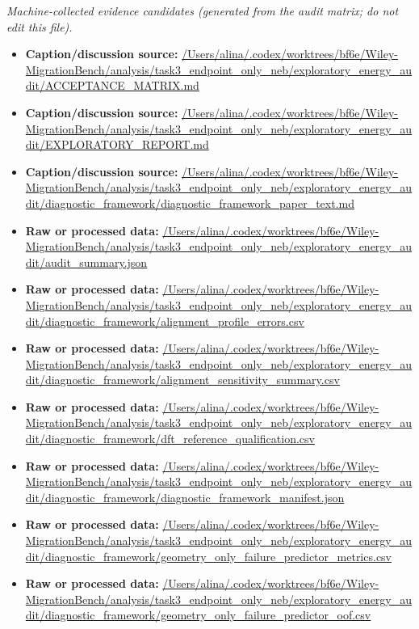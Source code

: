 \emph{Machine-collected evidence candidates (generated from the audit matrix; do not edit this file).}
\begin{itemize}[leftmargin=1.4em,noitemsep]
\item \textbf{Caption/discussion source:} \url{/Users/alina/.codex/worktrees/bf6e/Wiley-MigrationBench/analysis/task3_endpoint_only_neb/exploratory_energy_audit/ACCEPTANCE_MATRIX.md}
\item \textbf{Caption/discussion source:} \url{/Users/alina/.codex/worktrees/bf6e/Wiley-MigrationBench/analysis/task3_endpoint_only_neb/exploratory_energy_audit/EXPLORATORY_REPORT.md}
\item \textbf{Caption/discussion source:} \url{/Users/alina/.codex/worktrees/bf6e/Wiley-MigrationBench/analysis/task3_endpoint_only_neb/exploratory_energy_audit/diagnostic_framework/diagnostic_framework_paper_text.md}
\item \textbf{Raw or processed data:} \url{/Users/alina/.codex/worktrees/bf6e/Wiley-MigrationBench/analysis/task3_endpoint_only_neb/exploratory_energy_audit/audit_summary.json}
\item \textbf{Raw or processed data:} \url{/Users/alina/.codex/worktrees/bf6e/Wiley-MigrationBench/analysis/task3_endpoint_only_neb/exploratory_energy_audit/diagnostic_framework/alignment_profile_errors.csv}
\item \textbf{Raw or processed data:} \url{/Users/alina/.codex/worktrees/bf6e/Wiley-MigrationBench/analysis/task3_endpoint_only_neb/exploratory_energy_audit/diagnostic_framework/alignment_sensitivity_summary.csv}
\item \textbf{Raw or processed data:} \url{/Users/alina/.codex/worktrees/bf6e/Wiley-MigrationBench/analysis/task3_endpoint_only_neb/exploratory_energy_audit/diagnostic_framework/dft_reference_qualification.csv}
\item \textbf{Raw or processed data:} \url{/Users/alina/.codex/worktrees/bf6e/Wiley-MigrationBench/analysis/task3_endpoint_only_neb/exploratory_energy_audit/diagnostic_framework/diagnostic_framework_manifest.json}
\item \textbf{Raw or processed data:} \url{/Users/alina/.codex/worktrees/bf6e/Wiley-MigrationBench/analysis/task3_endpoint_only_neb/exploratory_energy_audit/diagnostic_framework/geometry_only_failure_predictor_metrics.csv}
\item \textbf{Raw or processed data:} \url{/Users/alina/.codex/worktrees/bf6e/Wiley-MigrationBench/analysis/task3_endpoint_only_neb/exploratory_energy_audit/diagnostic_framework/geometry_only_failure_predictor_oof.csv}

\end{itemize}
